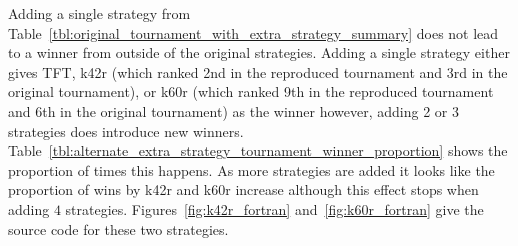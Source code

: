 \documentclass{article}
\begin{document}
Adding a single strategy from Table~\ref{tbl:original_tournament_with_extra_strategy_summary} 
does not lead to a winner from outside of the original strategies.
Adding a
single strategy either gives TFT, k42r (which ranked 2nd in the
reproduced tournament and 3rd in the original tournament), or k60r (which ranked
9th in the
reproduced tournament and 6th in the original tournament) as the
winner however, adding 2 or 3 strategies does introduce new winners.
Table~\ref{tbl:alternate_extra_strategy_tournament_winner_proportion} 
shows the proportion of times this happens. As more strategies are added it
looks like the proportion of wins by k42r and k60r increase although this effect
stops when adding $4$ strategies.
Figures~\ref{fig:k42r_fortran} and~\ref{fig:k60r_fortran} give the source code
for these two strategies.
\end{document}
